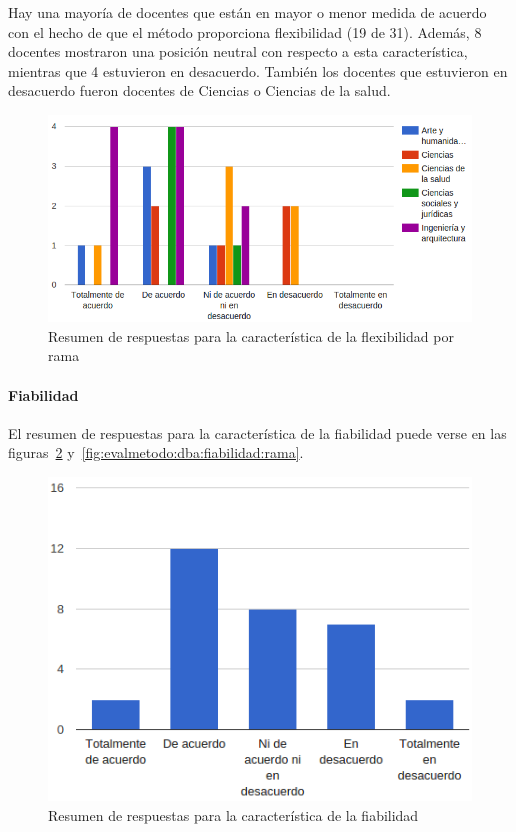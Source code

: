 Hay una mayoría de docentes que están en mayor o menor medida de acuerdo con el hecho de que el método proporciona flexibilidad (19 de 31). Además, 8 docentes mostraron una posición neutral con respecto a esta característica, mientras que 4 estuvieron en desacuerdo. También los docentes que estuvieron en desacuerdo fueron docentes de Ciencias o Ciencias de la salud.

\begin{figure}[h]
  \begin{center}
    \includegraphics[scale=0.5]{C_DBA_flexibilidad_rama.png}
  \end{center}
  \caption{Resumen de respuestas para la característica de la flexibilidad por rama}
  \label{fig:evalmetodo:dba:flexibilidad:rama}
\end{figure}


\newpage
\paragraph*{Fiabilidad}

El resumen de respuestas para la característica de la fiabilidad puede verse en las figuras~\ref{fig:evalmetodo:dba:fiabilidad} y~\ref{fig:evalmetodo:dba:fiabilidad:rama}.

\begin{figure}[h]
  \begin{center}
    \includegraphics[scale=0.45]{C_DBA_fiabilidad.png}
  \end{center}
  \caption{Resumen de respuestas para la característica de la fiabilidad}
  \label{fig:evalmetodo:dba:fiabilidad}
\end{figure}

